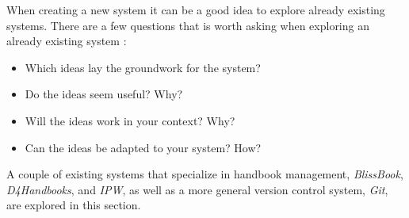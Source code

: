 When creating a new system it can be a good idea to explore already existing systems.
There are a few questions that is worth asking when exploring an already existing system \citep[p.~33]{Rod-Aalborg}:

\begin{itemize}
  \item Which ideas lay the groundwork for the system?
  \item Do the ideas seem useful? Why?
  \item Will the ideas work in your context? Why?
  \item Can the ideas be adapted to your system? How?
\end{itemize}


A couple of existing systems that specialize in handbook management, \textit{BlissBook}, \textit{D4Handbooks}, and \textit{IPW}, as well as a more general version control system, \textit{Git}, are explored in this section.
